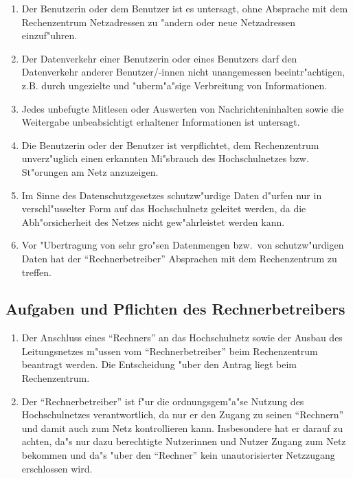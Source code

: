 \documentclass[12pt,titlepage,twoside]{scrartcl}
\begin{document}
\begin{appendix}
\begin{enumerate}
  \item Der Benutzerin oder dem Benutzer ist es untersagt, ohne
    Absprache mit dem Rechenzentrum Netzadressen zu "andern
    oder neue Netzadressen einzuf"uhren.

  \item Der Datenverkehr einer Benutzerin oder eines Benutzers darf den
    Datenverkehr anderer Benutzer/-innen nicht unangemessen
    beeintr"achtigen, z.B. durch ungezielte und
    "uberm"a"sige Verbreitung von Informationen.

  \item Jedes unbefugte Mitlesen oder Auswerten von Nachrichteninhalten
    sowie die Weitergabe unbeabsichtigt erhaltener Informationen
    ist untersagt.

  \item Die Benutzerin oder der Benutzer ist verpflichtet, dem
    Rechenzentrum unverz"uglich einen erkannten Mi"sbrauch
    des Hochschulnetzes bzw. St"orungen am Netz anzuzeigen.

  \item Im Sinne des Datenschutzgesetzes schutzw"urdige Daten d"urfen nur in
    verschl"usselter Form auf das Hochschulnetz geleitet werden, da die
    Abh"orsicherheit des Netzes nicht gew"ahrleistet werden kann.

  \item Vor "Ubertragung von sehr gro"sen Datenmengen bzw.\  von
    schutzw"urdigen Daten hat der "`Rechnerbetreiber"' Absprachen
    mit dem Rechenzentrum zu treffen.
\end{enumerate}

\subsection{Aufgaben und Pflichten des Rechnerbetreibers}

\begin{enumerate}
  \item Der Anschluss eines "`Rechners"' an das Hochschulnetz sowie
    der Ausbau des Leitungsnetzes m"ussen vom "`Rechnerbetreiber"'
    beim Rechenzentrum beantragt werden. Die Entscheidung "uber
    den Antrag liegt beim Rechenzentrum.

  \item Der "`Rechnerbetreiber"' ist f"ur die ordnungsgem"a"se
    Nutzung des Hochschulnetzes verantwortlich, da nur er den
    Zugang zu seinen "`Rechnern"' und damit auch zum Netz kontrollieren
    kann. Insbesondere hat er darauf zu achten, da"s nur
    dazu berechtigte Nutzerinnen und Nutzer Zugang zum Netz
    bekommen und da"s "uber den "`Rechner"' kein
    unautorisierter Netzzugang erschlossen wird.


\end{enumerate}
\end{appendix}
\end{document}
